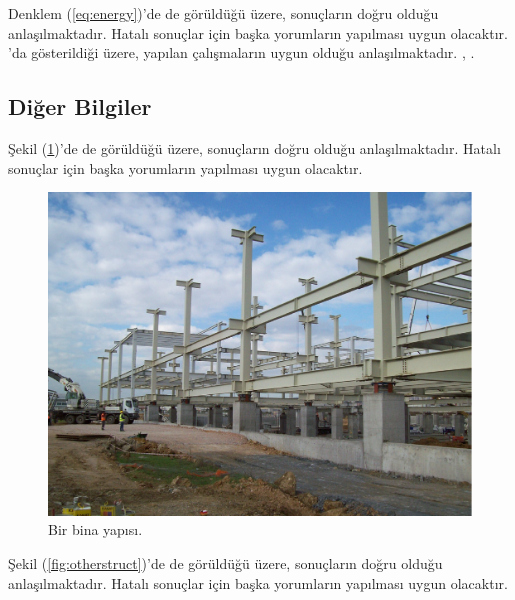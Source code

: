 \documentclass[english]{eqengconf}
\begin{document}
Denklem (\ref{eq:energy})'de de görüldüğü üzere, sonuçların doğru olduğu 
anlaşılmaktadır. Hatalı sonuçlar için başka yorumların yapılması uygun 
olacaktır. \textcite{Narasimhan2006, Erkus2006}'da gösterildiği üzere, yapılan 
çalışmaların uygun olduğu anlaşılmaktadır. \cite{Bekin2018-MSThesis}, 
\cite{Constantinou2011}.

\blindtext

\subsection{Diğer Bilgiler}
\blindtext

Şekil (\ref{fig:structure})'de de görüldüğü üzere, sonuçların doğru olduğu anlaşılmaktadır. Hatalı sonuçlar için başka yorumların yapılması uygun olacaktır.

\blindtext

\begin{figure}
	\vspace{-12pt}
	\centering
	\includegraphics[scale=0.2]{b.PNG}
	\caption{\label{fig:structure}Bir bina yapısı.}
	\vspace{-10pt}
\end{figure}

\blindtext

Şekil (\ref{fig:otherstruct})'de de görüldüğü üzere, sonuçların doğru olduğu anlaşılmaktadır. Hatalı sonuçlar için başka yorumların yapılması uygun olacaktır.
\end{document}
